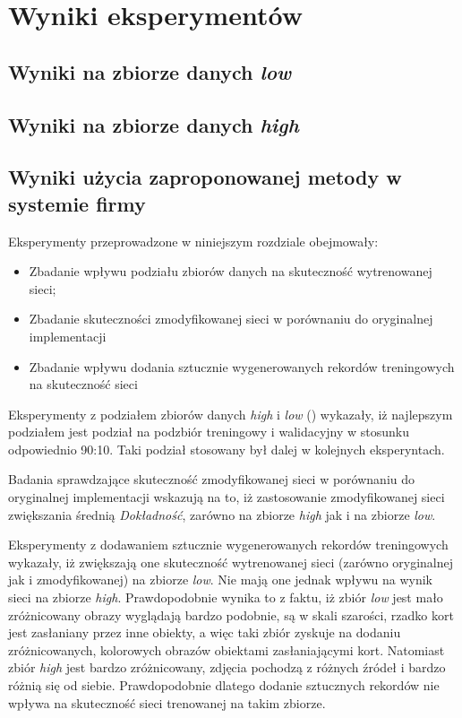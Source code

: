\section{Wyniki eksperymentów}

\subsection{Wyniki na zbiorze danych \textit{low}}
\subsection{Wyniki na zbiorze danych \textit{high}}
\subsection{Wyniki użycia zaproponowanej metody w systemie firmy \blue{}}
\TODO{}

Eksperymenty przeprowadzone w niniejszym rozdziale obejmowały:
\begin{itemize}
 \item Zbadanie wpływu podziału zbiorów danych na skuteczność wytrenowanej sieci;
 \item Zbadanie skuteczności zmodyfikowanej sieci w porównaniu do oryginalnej implementacji
 \item Zbadanie wpływu dodania sztucznie wygenerowanych rekordów treningowych na skuteczność sieci
\end{itemize}

Eksperymenty z podziałem zbiorów danych \textit{high} i \textit{low} () wykazały, iż najlepszym podziałem jest podział na podzbiór treningowy i walidacyjny w stosunku odpowiednio 90:10. Taki podział stosowany był dalej w kolejnych eksperyntach.


Badania sprawdzające skuteczność zmodyfikowanej sieci w porównaniu do oryginalnej implementacji wskazują na to, iż zastosowanie zmodyfikowanej sieci zwiększania średnią \textit{Dokładność}, zarówno na zbiorze \textit{high} jak i na zbiorze \textit{low}.


Eksperymenty z dodawaniem sztucznie wygenerowanych rekordów treningowych wykazały, iż zwiększają one skuteczność wytrenowanej sieci (zarówno oryginalnej jak i zmodyfikowanej) na zbiorze \textit{low}. Nie mają one jednak wpływu na wynik sieci na zbiorze \textit{high}. Prawdopodobnie wynika to z faktu, iż zbiór \textit{low} jest mało zróżnicowany obrazy wyglądają bardzo podobnie, są w skali szarości, rzadko kort jest zasłaniany przez inne obiekty, a więc taki zbiór zyskuje na dodaniu zróżnicowanych, kolorowych obrazów obiektami zasłaniającymi kort. Natomiast zbiór \textit{high} jest bardzo zróżnicowany, zdjęcia pochodzą z różnych źródeł i bardzo różnią się od siebie. Prawdopodobnie dlatego dodanie sztucznych rekordów nie wpływa na skuteczność sieci trenowanej na takim zbiorze.
